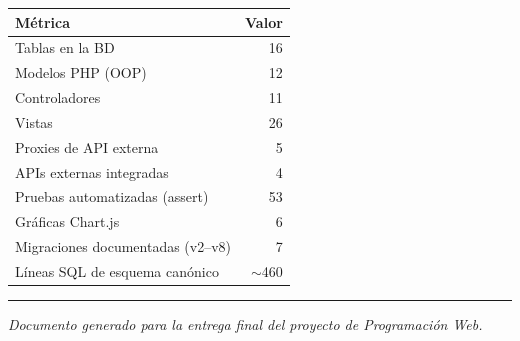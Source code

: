 \documentclass[11pt,a4paper]{article}
\begin{document}
\begin{tabular}{lr}
\toprule
\textbf{Métrica} & \textbf{Valor} \\
\midrule
Tablas en la BD                  & 16 \\
Modelos PHP (OOP)                & 12 \\
Controladores                    & 11 \\
Vistas                           & 26 \\
Proxies de API externa           & 5 \\
APIs externas integradas         & 4 \\
Pruebas automatizadas (assert)   & 53 \\
Gráficas Chart.js                & 6 \\
Migraciones documentadas (v2--v8)& 7 \\
Líneas SQL de esquema canónico   & $\sim$460 \\
\bottomrule
\end{tabular}

\vspace{1cm}
\hrule
\vspace{0.3cm}
\textit{Documento generado para la entrega final del proyecto de Programación Web.}
\end{document}
